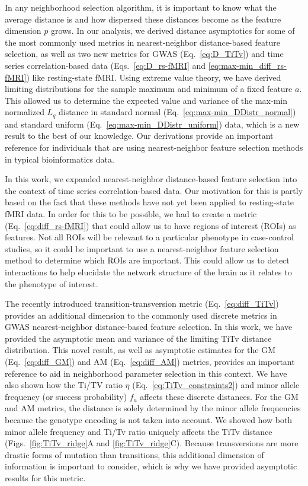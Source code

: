 \documentclass[aoas]{imsart}
\begin{document}
In any neighborhood selection algorithm, it is important to know what the average distance is and how dispersed these distances become as the feature dimension $p$ grows. In our analysis, we derived distance asymptotics for some of the most commonly used metrics in nearest-neighbor distance-based feature selection, as well as two new metrics for GWAS (Eq.~\ref{eq:D_TiTv}) and time series correlation-based data (Eqs.~\ref{eq:D_rs-fMRI} and \ref{eq:max-min_diff_rs-fMRI}) like resting-state fMRI. Using extreme value theory, we have derived limiting distributions for the sample maximum and minimum of a fixed feature $a$. This allowed us to determine the expected value and variance of the max-min normalized $L_q$ distance in standard normal (Eq.~\ref{eq:max-min_DDistr_normal}) and standard uniform (Eq.~\ref{eq:max-min_DDistr_uniform}) data, which is a new result to the best of our knowledge. Our derivations provide an important reference for individuals that are using nearest-neighbor feature selection methods in typical bioinformatics data. 

In this work, we expanded nearest-neighbor distance-based feature selection into the context of time series correlation-based data. Our motivation for this is partly based on the fact that these methods have not yet been applied to resting-state fMRI data. In order for this to be possible, we had to create a metric (Eq.~\ref{eq:diff_rs-fMRI}) that could allow us to have regions of interest (ROIs) as features. Not all ROIs will be relevant to a particular phenotype in case-control studies, so it could be important to use a nearest-neighbor feature selection method to determine which ROIs are important. This could allow us to detect interactions to help elucidate the network structure of the brain as it relates to the phenotype of interest.

The recently introduced transition-transversion metric (Eq.~\ref{eq:diff_TiTv}) provides an additional dimension to the commonly used discrete metrics in GWAS nearest-neighbor distance-based feature selection. In this work, we have provided the asymptotic mean and variance of the limiting TiTv distance distribution. This novel result, as well as asymptotic estimates for the GM (Eq.~\ref{eq:diff_GM}) and AM (Eq.~\ref{eq:diff_AM}) metrics, provides an important reference to aid in neighborhood parameter selection in this context. We have also shown how the Ti/TV ratio $\eta$ (Eq.~\ref{eq:TiTv_constraints2}) and minor allele frequency (or success probability) $f_a$ affects these discrete distances. For the GM and AM metrics, the distance is solely determined by the minor allele frequencies because the genotype encoding is not taken into account. We showed how both minor allele frequency and Ti/Tv ratio uniquely affects the TiTv distance (Figs.~\ref{fig:TiTv_ridge}A and \ref{fig:TiTv_ridge}C). Because transversions are more drastic forms of mutation than transitions, this additional dimension of information is important to consider, which is why we have provided asymptotic results for this metric.
\end{document}
